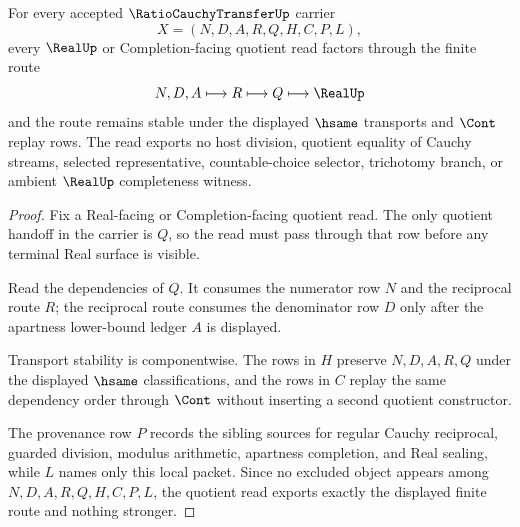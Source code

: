 \begin{theorem}
\label{thm:ratio-cauchy-transfer-quotient-route}
For every accepted $\RatioCauchyTransferUp$ carrier
$$
X=(N,D,A,R,Q,H,C,P,L),
$$
every $\RealUp$ or Completion-facing quotient read factors through the finite route
$$
N,D,A \longmapsto R \longmapsto Q \longmapsto \RealUp
$$
and the route remains stable under the displayed $\hsame$ transports and $\Cont$ replay rows. The read exports no host division, quotient equality of Cauchy streams, selected representative, countable-choice selector, trichotomy branch, or ambient $\RealUp$ completeness witness.
\end{theorem}
\begin{proof}
Fix a Real-facing or Completion-facing quotient read. The only quotient handoff in the carrier is $Q$, so the read must pass through that row before any terminal Real surface is visible.

Read the dependencies of $Q$. It consumes the numerator row $N$ and the reciprocal route $R$; the reciprocal route consumes the denominator row $D$ only after the apartness lower-bound ledger $A$ is displayed.

Transport stability is componentwise. The rows in $H$ preserve $N,D,A,R,Q$ under the displayed $\hsame$ classifications, and the rows in $C$ replay the same dependency order through $\Cont$ without inserting a second quotient constructor.

The provenance row $P$ records the sibling sources for regular Cauchy reciprocal, guarded division, modulus arithmetic, apartness completion, and Real sealing, while $L$ names only this local packet. Since no excluded object appears among $N,D,A,R,Q,H,C,P,L$, the quotient read exports exactly the displayed finite route and nothing stronger.
\end{proof}


